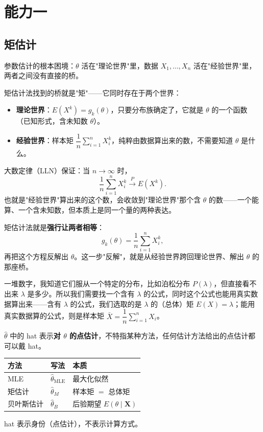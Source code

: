 \chapter{能力一}
\section{矩估计}
\begin{note}
参数估计的根本困境：$\theta$ 活在"理论世界"里，数据 $X_1,\dots,X_n$ 活在"经验世界"里，两者之间没有直接的桥。

矩估计法找到的桥就是"矩"——它同时存在于两个世界：

\begin{itemize}
    \item \textbf{理论世界}：$E(X^k)=g_k(\theta)$，只要分布族确定了，它就是 $\theta$ 的一个函数（已知形式，含未知数 $\theta$）。
    \item \textbf{经验世界}：样本矩 $\dfrac1n\displaystyle\sum_{i=1}^n X_i^k$，纯粹由数据算出来的数，不需要知道 $\theta$ 是什么。
\end{itemize}

大数定律（LLN）保证：当 $n\to\infty$ 时，
\[
\frac1n\sum_{i=1}^n X_i^k \xrightarrow{P} E(X^k).
\]
也就是"经验世界"算出来的这个数，会收敛到"理论世界"那个含 $\theta$ 的数——一个能算、一个含未知数，但本质上是同一个量的两种表达。

矩估计法就是\textbf{强行让两者相等}：
\[
g_k(\theta)=\frac1n\sum_{i=1}^n X_i^k,
\]
再把这个方程反解出 $\theta$。这一步"反解"，就是从经验世界跨回理论世界、解出 $\theta$ 的那座桥。
\end{note}
\begin{dxtips}
一堆数字，我知道它们服从一个特定的分布，比如泊松分布 $P(\lambda)$，但直接看不出来 $\lambda$ 是多少。所以我们需要找一个含有 $\lambda$ 的公式，同时这个公式也能用真实数据算出来——含有 $\lambda$ 的公式，我们选取的是 $\lambda$ 的（总体）矩 $E(X)=\lambda$；能用真实数据算的公式，则是样本矩 $\bar X=\dfrac1n\sum_{i=1}^n X_i$。
    \end{dxtips}
    \begin{note}
$\hat{\theta}$ 中的 hat 表示\textbf{对 $\theta$ 的点估计}，不特指某种方法，任何估计方法给出的点估计都可以戴 hat。

\begin{center}
\begin{tabular}{lll}
\toprule
\textbf{方法} & \textbf{写法} & \textbf{本质} \\
\midrule
MLE & $\hat{\theta}_{\mathrm{MLE}}$ & 最大化似然 \\
矩估计 & $\hat{\theta}_{M}$ & 样本矩 $=$ 总体矩 \\
贝叶斯估计 & $\hat{\theta}_{B}$ & 后验期望 $E(\theta\mid\boldsymbol{X})$ \\
\bottomrule
\end{tabular}
\end{center}

hat 表示身份（点估计），不表示计算方式。
\end{note}
